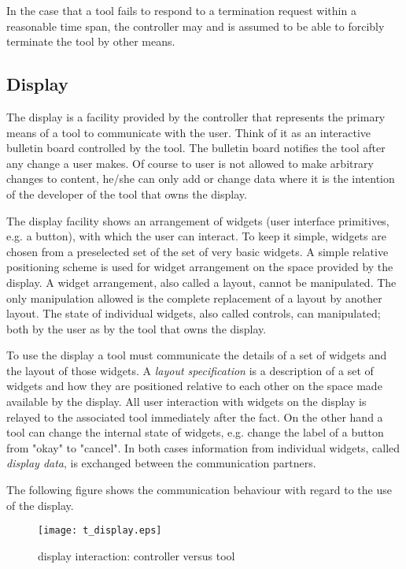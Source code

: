 \documentclass{article}
\begin{document}
   \noindent In the case that a tool fails to respond to a termination request
   within a reasonable time span, the controller may and is assumed to be able
   to forcibly terminate the tool by other means.
  \subsection{Display} \label{ss:user_interaction}

   The display is a facility provided by the controller that represents the
   primary means of a tool to communicate with the user.  Think of it as an
   interactive bulletin board controlled by the tool. The bulletin board
   notifies the tool after any change a user makes. Of course to user is not
   allowed to make arbitrary changes to content, he/she can only add or change
   data where it is the intention of the developer of the tool that owns the
   display.

   The display facility shows an arrangement of widgets (user interface
   primitives, e.g. a button), with which the user can interact. To keep it 
   simple, widgets are chosen from a preselected set of the set of very basic
   widgets. A simple relative positioning scheme is used for widget arrangement
   on the space provided by the display. A widget arrangement, also called a
   layout, cannot be manipulated. The only manipulation allowed is the complete
   replacement of a layout by another layout. The state of individual widgets,
   also called controls, can manipulated; both by the user as by the tool that
   owns the display.

   To use the display a tool must communicate the details of a set of widgets
   and the layout of those widgets. A \textit{layout specification} is a
   description of a set of widgets and how they are positioned relative to each
   other on the space made available by the display. All user interaction with
   widgets on the display is relayed to the associated tool immediately after
   the fact. On the other hand a tool can change the internal state of widgets,
   e.g. change the label of a button from "okay" to "cancel". In both cases
   information from individual widgets, called \textit{display data}, is
   exchanged between the communication partners.

   The following figure shows the communication behaviour with regard to the
   use of the display.
   
   \begin{figure}[H]
    \begin{center}
     \texttt{[image: t\_display.eps]}
    \end{center}
    \vspace{-0.4cm}
    \caption{display interaction: controller versus tool}
   \end{figure}
\end{document}
